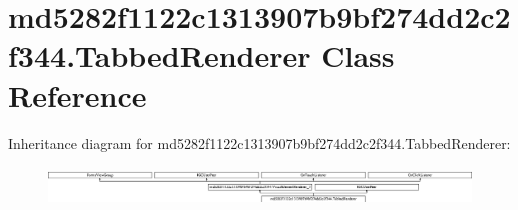 \hypertarget{classmd5282f1122c1313907b9bf274dd2c2f344_1_1TabbedRenderer}{}\section{md5282f1122c1313907b9bf274dd2c2f344.\+Tabbed\+Renderer Class Reference}
\label{classmd5282f1122c1313907b9bf274dd2c2f344_1_1TabbedRenderer}
Inheritance diagram for md5282f1122c1313907b9bf274dd2c2f344.\+Tabbed\+Renderer\+:\begin{figure}[H]
\begin{center}
\leavevmode
\includegraphics[height=1.029412cm]{classmd5282f1122c1313907b9bf274dd2c2f344_1_1TabbedRenderer}
\end{center}
\end{figure}
